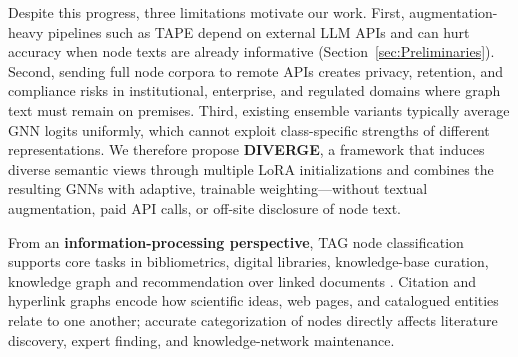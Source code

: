 \documentclass[a4paper,fleqn]{cas-sc}
\begin{document}
Despite this progress, three limitations motivate our work. First, augmentation-heavy pipelines such as TAPE \citep{he2024harnessing} depend on external LLM APIs and can hurt accuracy when node texts are already informative (Section~\ref{sec:Preliminaries}). Second, sending full node corpora to remote APIs creates privacy, retention, and compliance risks in institutional, enterprise, and regulated domains where graph text must remain on premises. Third, existing ensemble variants typically average GNN logits uniformly, which cannot exploit class-specific strengths of different representations. We therefore propose \textbf{DIVERGE}, a framework that induces diverse semantic views through multiple LoRA initializations and combines the resulting GNNs with adaptive, trainable weighting---without textual augmentation, paid API calls, or off-site disclosure of node text.


From an \textbf{information-processing perspective}, TAG node classification supports core tasks in bibliometrics, digital libraries, knowledge-base curation, knowledge graph and recommendation over linked documents \citep{Zhang2024TAGSurvey, RAMIREZMOLINA2026104842, WANG2026DGRLS}. Citation and hyperlink graphs encode how scientific ideas, web pages, and catalogued entities relate to one another; accurate categorization of nodes directly affects literature discovery, expert finding, and knowledge-network maintenance.
\end{document}
